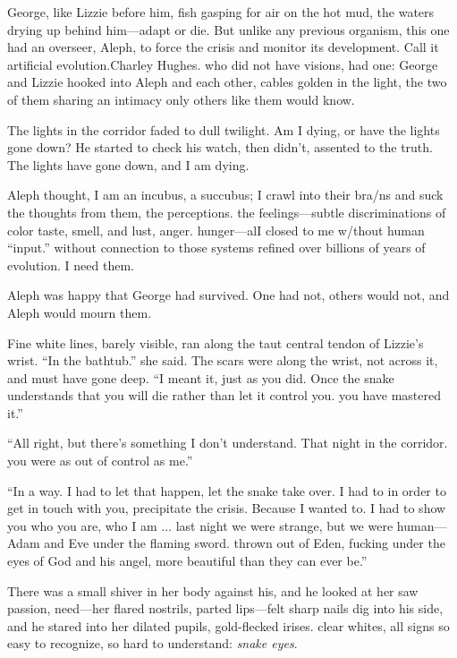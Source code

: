 George, like Lizzie before him, fish gasping for air on the hot mud, the waters drying up behind him—adapt or die. But unlike any previous organism, this one had an overseer, Aleph, to force the crisis and monitor its development. Call it artificial evolution.Charley Hughes. who did not have visions, had one: George and Lizzie hooked into Aleph and each other, cables golden in the light, the two of them sharing an intimacy only others like them would know.

The lights in the corridor faded to dull twilight. Am I dying, or have the lights gone down? He started to check his watch, then didn't, assented to the truth. The lights have gone down, and I am dying.

Aleph thought, I am an incubus, a succubus; I crawl into their bra/ns and suck the thoughts from them, the perceptions. the feelings—subtle discriminations of color taste, smell, and lust, anger. hunger—alI closed to me w/thout human ``input.'' without connection to those systems refined over billions of years of evolution. I need them.

Aleph was happy that George had survived. One had not, others would not, and Aleph would mourn them.

Fine white lines, barely visible, ran along the taut central tendon of Lizzie's wrist. ``In the bathtub.'' she said. The scars were along the wrist, not across it, and must have gone deep. ``I meant it, just as you did. Once the snake understands that you will die rather than let it control you. you have mastered it.''

``All right, but there's something I don't understand. That night in the corridor. you were as out of control as me.''

``In a way. I had to let that happen, let the snake take over. I had to in order to get in touch with you, precipitate the crisis. Because I wanted to. I had to show you who you are, who I am ... last night we were strange, but we were human—Adam and Eve under the flaming sword. thrown out of Eden, fucking under the eyes of God and his angel, more beautiful than they can ever be.''

There was a small shiver in her body against his, and he looked at her saw passion, need—her flared nostrils, parted lips—felt sharp nails dig into his side, and he stared into her dilated pupils, gold-flecked irises. clear whites, all signs so easy to recognize, so hard to understand: \textit{snake eyes}.     